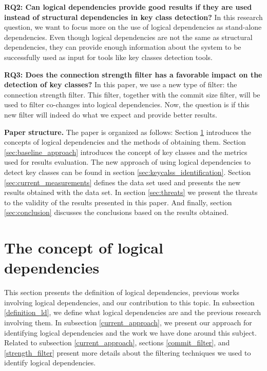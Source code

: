 \documentclass[runningheads]{comsis2}
\begin{document}
\textbf{RQ2: Can logical dependencies provide good results if they are used instead of structural dependencies in key class detection?}
In this research question, we want to focus more on the use of logical dependencies as stand-alone dependencies. Even though logical dependencies are not the same as structural dependencies, they can provide enough information about the system to be successfully used as input for tools like key classes detection tools. 

\textbf{RQ3: Does the connection strength filter has a favorable impact on the detection of key classes?}
In this paper, we use a new type of filter: the connection strength filter. This filter, together with the commit size filter, will be used to filter co-changes into logical dependencies. Now, the question is if this new filter will indeed do what we expect and provide better results.

\textbf{Paper structure.} The paper is organized as follows: Section \ref{ld_def} introduces the concepts of logical dependencies and the methods of obtaining them. Section \ref{sec:baseline_approach} introduces the concept of key classes and the metrics used for results evaluation. The new approach of using logical dependencies to detect key classes can be found in section \ref{sec:keycalss_identification}. Section \ref{sec:current_measurements} defines the data set used and presents the new results obtained with the data set. In section \ref{sec:threats} we present the threats to the validity of the results presented in this paper. And finally, section \ref{sec:conclusion} discusses the conclusions based on the results obtained. 




\section{The concept of logical dependencies}
\label{ld_def}
This section presents the definition of logical dependencies, previous works involving logical dependencies, and our contribution to this topic. In subsection \ref{definition_ld}, we define what logical dependencies are and the previous research involving them. In subsection \ref{current_approach}, we present our approach for identifying logical dependencies and the work we have done around this subject. Related to subsection \ref{current_approach}, sections \ref{commit_filter}, and \ref{strength_filter} present more details about the filtering techniques we used to identify logical dependencies.
\end{document}
